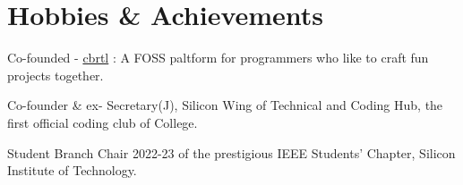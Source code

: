 \documentclass[]{assets/deedy-resume-openfont}
\begin{document}
\section{Hobbies \& Achievements}
\begin{tightemize}  
\item Co-founded - \href{https://cbrtl.github.io}{cbrtl} : A FOSS paltform for programmers who like to craft fun projects together.\\
\item Co-founder \& ex- Secretary(J), Silicon Wing of Technical and Coding Hub, the first official coding club of College.\\
\item Student Branch Chair 2022-23 of the prestigious IEEE Students’ Chapter, Silicon Institute of Technology.\\
\end{tightemize}
\ 
\end{document}
